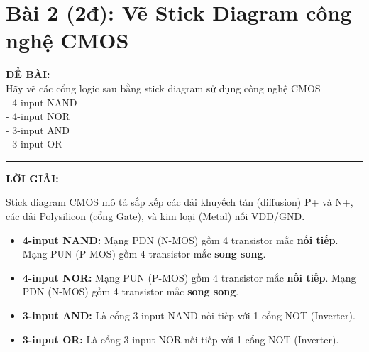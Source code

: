 \documentclass[12pt,a4paper]{article}
\begin{document}
\section{Bài 2 (2đ): Vẽ Stick Diagram công nghệ CMOS}
\textbf{ĐỀ BÀI:} \\
Hãy vẽ các cổng logic sau bằng stick diagram sử dụng công nghệ CMOS\\
- 4-input NAND\\
- 4-input NOR\\
- 3-input AND\\
- 3-input OR

\hrule\vspace{0.5cm}
\textbf{LỜI GIẢI:}

Stick diagram CMOS mô tả sắp xếp các dải khuyếch tán (diffusion) P+ và N+, các dải Polysilicon (cổng Gate), và kim loại (Metal) nối VDD/GND.

\begin{itemize}
    \item \textbf{4-input NAND:} Mạng PDN (N-MOS) gồm 4 transistor mắc \textbf{nối tiếp}. Mạng PUN (P-MOS) gồm 4 transistor mắc \textbf{song song}.
    \item \textbf{4-input NOR:} Mạng PUN (P-MOS) gồm 4 transistor mắc \textbf{nối tiếp}. Mạng PDN (N-MOS) gồm 4 transistor mắc \textbf{song song}.
    \item \textbf{3-input AND:} Là cổng 3-input NAND nối tiếp với 1 cổng NOT (Inverter).
    \item \textbf{3-input OR:} Là cổng 3-input NOR nối tiếp với 1 cổng NOT (Inverter).
\end{itemize}
\end{document}
